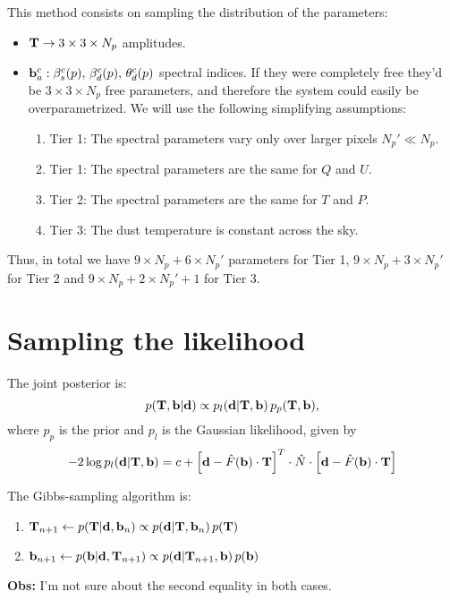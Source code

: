 \documentclass[a4paper,10pt]{article}
\begin{document}
This method consists on sampling the distribution of the parameters:
\begin{itemize}
 \item ${\bf T}\rightarrow 3\times3\times N_p$ amplitudes.
 \item ${\bf b}^c_a: \beta_s^c(p),\,\beta_d^c(p),\,\theta_d^c(p)$ spectral indices. If they were completely free they'd
       be $3\times3\times N_p$ free parameters, and therefore the system could easily be overparametrized. We will use the
       following simplifying assumptions:
       \begin{enumerate}
        \item Tier 1: The spectral parameters vary only over larger pixels $N_p'\ll N_p$.
        \item Tier 1: The spectral parameters are the same for $Q$ and $U$.
        \item Tier 2: The spectral parameters are the same for $T$ and $P$.
        \item Tier 3: The dust temperature is constant across the sky.
       \end{enumerate}
\end{itemize}
Thus, in total we have $9\times N_p+6\times N_p'$ parameters for Tier 1, $9\times N_p+3\times N_p'$ for Tier 2 and $9\times N_p+2\times N_p'+1$ for Tier 3.

\section{Sampling the likelihood}
The joint posterior is:
\begin{equation}
 p({\bf T},{\bf b}|{\bf d})\propto p_l({\bf d}|{\bf T},{\bf b})\,p_p({\bf T},{\bf b}),
\end{equation}
where $p_p$ is the prior and $p_l$ is the Gaussian likelihood, given by
\begin{equation}
  -2\log p_l({\bf d}|{\bf T},{\bf b})=c+\left[{\bf d}-\hat{F}({\bf b})\cdot{\bf T}\right]^T\cdot\hat{N}\cdot\left[{\bf d}-\hat{F}({\bf b})\cdot{\bf T}\right]
\end{equation}

The Gibbs-sampling algorithm is:
\begin{enumerate}
 \item ${\bf T}_{n+1}\leftarrow p({\bf T}|{\bf d},{\bf b}_n)\propto p({\bf d}|{\bf T},{\bf b}_n)\,p({\bf T})$
 \item ${\bf b}_{n+1}\leftarrow p({\bf b}|{\bf d},{\bf T}_{n+1})\propto p({\bf d}|{\bf T}_{n+1},{\bf b})\,p({\bf b})$ 
\end{enumerate}
{\bf Obs:} I'm not sure about the second equality in both cases.
\end{document}
